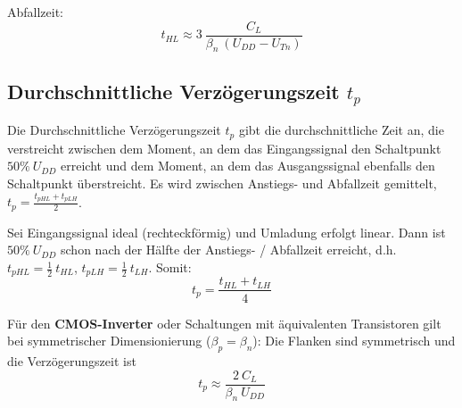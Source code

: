 \documentclass[a4paper,11pt]{article}
\begin{document}
Abfallzeit:
\[
	\boxed{ \quad t_{HL} \approx 3 ~ \frac{C_L}{\beta_n ~ (U_{DD} - U_{Tn})} \quad }
\]

\subsection*{Durchschnittliche Verzögerungszeit $t_p$}
Die Durchschnittliche Verzögerungszeit $t_p$ gibt die durchschnittliche Zeit an, die verstreicht zwischen dem Moment, an dem das Eingangssignal den Schaltpunkt $50 \% ~ U_{DD}$ erreicht und dem Moment, an dem das Ausgangssignal ebenfalls den Schaltpunkt überstreicht. Es wird zwischen Anstiegs- und Abfallzeit gemittelt, $t_p = \frac{t_{pHL} + t_{pLH}}{2}$.

Sei Eingangssignal ideal (rechteckförmig) und Umladung erfolgt linear. Dann ist $50 \% ~ U_{DD}$ schon nach der Hälfte der Anstiegs- / Abfallzeit erreicht, d.h. $t_{pHL} = \frac{1}{2} ~ t_{HL}$, $t_{pLH} = \frac{1}{2} ~ t_{LH}$. Somit:
\[
	t_p = \frac{t_{HL} + t_{LH}}{4}
\]

Für den \textbf{CMOS-Inverter} oder Schaltungen mit äquivalenten Transistoren gilt bei symmetrischer Dimensionierung ($\beta_p = \beta_n$): Die Flanken sind symmetrisch und die Verzögerungszeit ist
\[
	\boxed{ \quad t_p \approx \frac{2 ~ C_L}{\beta_n ~ U_{DD}} \quad }
\]
\end{document}

